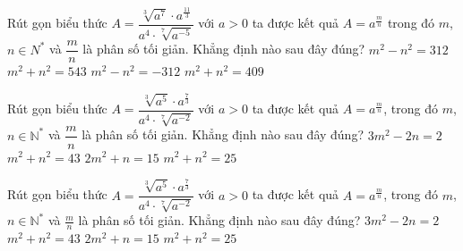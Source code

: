 \begin{ex}%
	Rút gọn biểu thức $A=\dfrac{\sqrt[3]{a^7}\cdot a^{\tfrac{11}{3}}}{a^4\cdot \sqrt[7]{a^{-5}}}$ với $a>0$ ta được  kết quả $A=a^{\tfrac{m}{n}}$ trong đó $m$, $n\in{N^{*}}$ và $\dfrac{m}{n}$ là phân số tối giản. Khẳng định nào sau đây đúng?
	 \choice
		 {\True $m^2-n^2=312$}
		{$m^2+n^2=543$} 
		 {$m^2-n^2=-312$}
		 {$m^2+n^2=409$}
\end{ex}

\begin{ex}%
	Rút gọn biểu thức $A=\dfrac{\sqrt[3]{a^5}\cdot a^{\tfrac{7}{3}}}{a^4\cdot \sqrt[7]{a^{-2}}}$ với $a>0$ ta được kết quả $A=a^{\tfrac{m}{n}}$, trong đó $m$, $n\in{\mathbb{N}^{*}}$ và $\dfrac{m}{n}$ là phân số tối giản. Khẳng định  nào sau đây đúng?
	 \choice
		{$3m^2-2n=2$} 
		{$m^2+n^2=43$} 
		{\True $2m^2+n=15$} 
		 {$m^2+n^2=25$}
\end{ex}

\begin{ex}%
	Rút gọn biểu thức $A=\dfrac{\sqrt[3]{a^5}\cdot a^{\tfrac73}}{a^{4}\cdot\sqrt[7]{a^{-2}}}$ với $a>0$ ta được kết quả  $A=a^{\tfrac{m}{n}}$, trong đó $m$, $n\in\mathbb{N}^{*}$ và $\tfrac{m}{n}$ là phân số tối giản. Khẳng định nào sau đây đúng?
	 \choice
		 {$3m^2-2n=2$}
		 {$m^2+n^2=43$}
		 {\True $2m^2+n=15$}
		{$m^2+n^2=25$} 
\end{ex}

